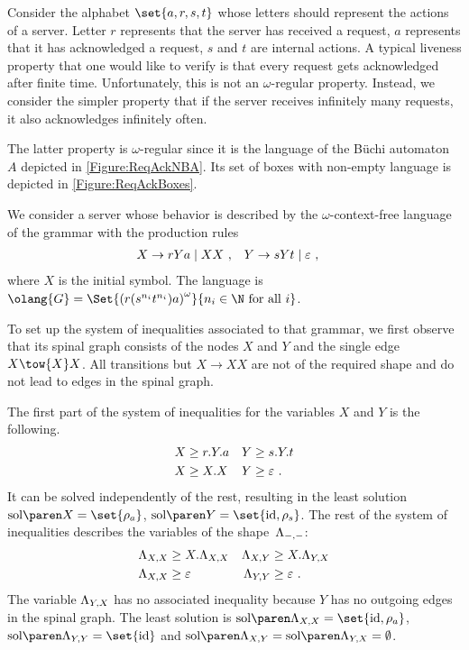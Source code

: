 \documentclass[../../diss.tex]{subfiles}
\begin{document}
\begin{example}
    Consider the alphabet $\set{a,r,s,t}$ whose letters should represent the actions of a server.
    Letter $r$ represents that the server has received a request, $a$ represents that it has acknowledged a request, $s$ and $t$ are internal actions.
    A typical liveness property that one would like to verify is that every request gets acknowledged after finite time.
    Unfortunately, this is not an $\omega$-regular property.
    Instead, we consider the simpler property that if the server receives infinitely many requests, it also acknowledges infinitely often.

    The latter property is $\omega$-regular since it is the language of the Büchi automaton $A$ depicted in \cref{Figure:ReqAckNBA}.
    Its set of boxes with non-empty language is depicted in \cref{Figure:ReqAckBoxes}.

    We consider a server whose behavior is described by the $\omega$-context-free language of the grammar with the production rules
    \begin{align*}
        X &\to r Y a \mid XX\ ,
        &Y &\to s Y t \mid \varepsilon\ ,
    \end{align*}
    where $X$ is the initial symbol.
    The language is $\olang{G} = \Set{ {(r (s^{n_i}t^{n_i}) a)}^\omega  }{n_i \in \N \text{ for all } i}$.

    To set up the system of inequalities associated to that grammar, we first observe that its spinal graph consists of the nodes $X$ and $Y$ and the single edge $X \tow{X} X$.
    All transitions but $X \to XX$ are not of the required shape and do not lead to edges in the spinal graph.

    The first part of the system of inequalities for the variables $X$ and $Y$ is the following.
    \begin{align*}
        X &\geq r.Y.a
        &
        Y &\geq s . Y . t
        \\
        X &\geq X.X
        &
        Y &\geq \varepsilon
        \ .
    \end{align*}
    It can be solved independently of the rest, resulting in the least solution $\sol{X} = \set{\tbox{a}}$, $\sol{Y} = \set{\id, \tbox{s}}$.
    The rest of the system of inequalities describes the variables of the shape~$\Lambda_{-,-}$:
    \begin{align*}
        \Lambda_{X,X} &\geq X.\Lambda_{X,X}
        &
        \Lambda_{X,Y} &\geq X.\Lambda_{Y,X}
        \\
        \Lambda_{X,X} &\geq \varepsilon
        &
        \Lambda_{Y,Y} &\geq \varepsilon
        \ .
    \end{align*}
    The variable $\Lambda_{Y,X}$ has no associated inequality because $Y$ has no outgoing edges in the spinal graph.
    The least solution is $\sol{\cvar{X}{X}} = \set{\id,\tbox{a}}$, $\sol{\cvar{Y}{Y}} = \set{\id}$ and $ \sol{\cvar{X}{Y}} = \sol{\cvar{Y}{X}} = \emptyset$.


\end{example}
\end{document}
